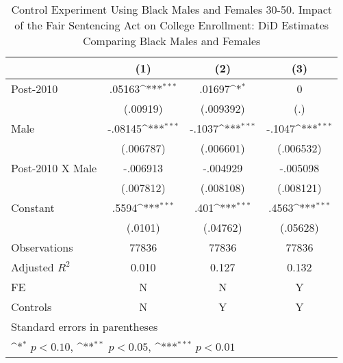 \begin{table}[htbp]\centering
\def\sym#1{\ifmmode^{#1}\else\(^{#1}\)\fi}
\caption{Control Experiment Using Black Males and Females 30-50. Impact of the Fair Sentencing Act on College Enrollment: DiD Estimates Comparing Black Males and Females}
\begin{tabular}{l*{3}{c}}
\hline\hline
                    &\multicolumn{1}{c}{(1)}         &\multicolumn{1}{c}{(2)}         &\multicolumn{1}{c}{(3)}         \\
\hline
Post-2010           &      .05163\sym{***}&      .01697\sym{*}  &           0         \\
                    &    (.00919)         &   (.009392)         &         (.)         \\
[1em]
Male                &     -.08145\sym{***}&      -.1037\sym{***}&      -.1047\sym{***}\\
                    &   (.006787)         &   (.006601)         &   (.006532)         \\
[1em]
Post-2010 X Male    &    -.006913         &    -.004929         &    -.005098         \\
                    &   (.007812)         &   (.008108)         &   (.008121)         \\
[1em]
Constant            &       .5594\sym{***}&        .401\sym{***}&       .4563\sym{***}\\
                    &     (.0101)         &    (.04762)         &    (.05628)         \\
\hline
Observations        &       77836         &       77836         &       77836         \\
Adjusted \(R^{2}\)  &       0.010         &       0.127         &       0.132         \\
FE                  &           N         &           N         &           Y         \\
Controls            &           N         &           Y         &           Y         \\
\hline\hline
\multicolumn{4}{l}{\footnotesize Standard errors in parentheses}\\
\multicolumn{4}{l}{\footnotesize \sym{*} \(p<0.10\), \sym{**} \(p<0.05\), \sym{***} \(p<0.01\)}\\
\end{tabular}
\end{table}
